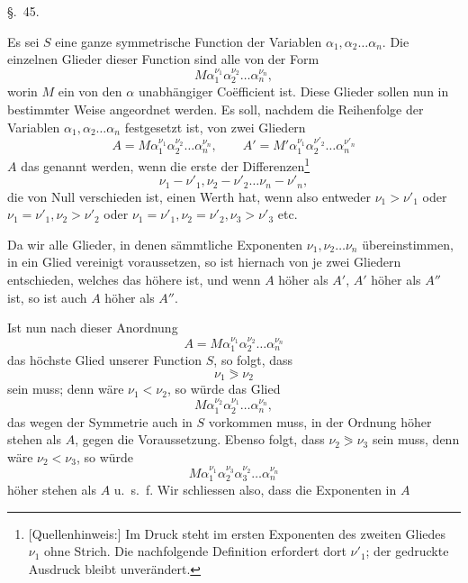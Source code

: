 \begin{center}
{\large \S.\ 45.}

\vspace{0.5em}
{\large{}}
\end{center}

Es sei $S$ eine ganze symmetrische Function der Variablen $\alpha_1,\alpha_2\ldots\alpha_n$. Die einzelnen Glieder dieser Function sind alle von der Form
\[
 M\alpha_1^{\nu_1}\alpha_2^{\nu_2}\ldots\alpha_n^{\nu_n},
\]
worin $M$ ein von den $\alpha$ unabhängiger Coëfficient ist. Diese Glieder sollen nun in bestimmter Weise angeordnet werden. Es soll, nachdem die Reihenfolge der Variablen $\alpha_1,\alpha_2\ldots\alpha_n$ festgesetzt ist, von zwei Gliedern
\[
 A=M\alpha_1^{\nu_1}\alpha_2^{\nu_2}\ldots\alpha_n^{\nu_n},\qquad
 A'=M'\alpha_1^{\nu_1}\alpha_2^{\nu'_2}\ldots\alpha_n^{\nu'_n}
\]
$A$ das  genannt werden, wenn die erste der Differenzen\begingroup\renewcommand{\thefootnote}{E1}\footnote[1]{[Quellenhinweis:] Im Druck steht im ersten Exponenten des zweiten Gliedes $\nu_1$ ohne Strich. Die nachfolgende Definition erfordert dort $\nu'_1$; der gedruckte Ausdruck bleibt unverändert.}\endgroup
\[
 \nu_1-\nu'_1,\nu_2-\nu'_2\ldots\nu_n-\nu'_n,
\]
die von Null verschieden ist, einen  Werth hat, wenn also entweder $\nu_1>\nu'_1$ oder $\nu_1=\nu'_1,\nu_2>\nu'_2$ oder $\nu_1=\nu'_1,\nu_2=\nu'_2,\nu_3>\nu'_3$ etc.

Da wir alle Glieder, in denen sämmtliche Exponenten $\nu_1,\nu_2\ldots\nu_n$ übereinstimmen, in ein Glied vereinigt voraussetzen, so ist hiernach von je zwei Gliedern entschieden, welches das höhere ist, und wenn $A$ höher als $A'$, $A'$ höher als $A''$ ist, so ist auch $A$ höher als $A''$.

Ist nun nach dieser Anordnung
\[
 A=M\alpha_1^{\nu_1}\alpha_2^{\nu_2}\ldots\alpha_n^{\nu_n}
\]
das höchste Glied unserer Function $S$, so folgt, dass
\[
 \nu_1\eqslantgtr\nu_2
\]
sein muss; denn wäre $\nu_1<\nu_2$, so würde das Glied
\[
 M\alpha_1^{\nu_2}\alpha_2^{\nu_1}\ldots\alpha_n^{\nu_n},
\]
das wegen der Symmetrie auch in $S$ vorkommen muss, in der Ordnung höher stehen als $A$, gegen die Voraussetzung. Ebenso folgt, dass $\nu_2\eqslantgtr\nu_3$ sein muss, denn wäre $\nu_2<\nu_3$, so würde
\[
 M\alpha_1^{\nu_1}\alpha_2^{\nu_3}\alpha_3^{\nu_2}\ldots\alpha_n^{\nu_n}
\]
höher stehen als $A$ u.\ s.\ f. Wir schliessen also, dass die Exponenten in $A$
